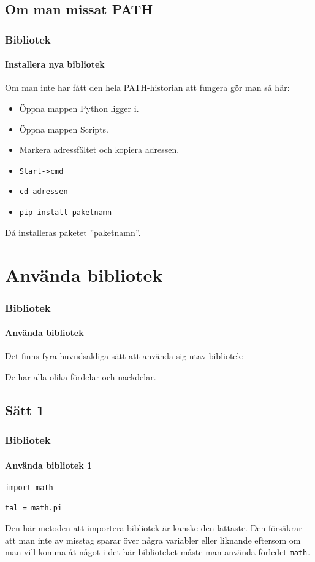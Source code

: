 \documentclass{beamer}
\begin{document}
\subsection{Om man missat PATH}

\begin{frame}[fragile]
	\frametitle{Bibliotek}
	\framesubtitle{Installera nya bibliotek}
	
	Om man inte har fått den hela PATH-historian att fungera gör man så här:
	
	\begin{itemize}
		\item Öppna mappen Python ligger i.
		\item Öppna mappen Scripts.
		\item Markera adressfältet och kopiera adressen.
		\item \texttt{Start->cmd}
		\item \texttt{cd adressen}
		\item \texttt{pip install paketnamn}
	\end{itemize}
	
	Då installeras paketet ''paketnamn''.

\end{frame}

\section{Använda bibliotek}

\begin{frame}
	\frametitle{Bibliotek}
	\framesubtitle{Använda bibliotek}
	
	Det finns fyra huvudsakliga sätt att använda sig utav bibliotek:
	
	De har alla olika fördelar och nackdelar.

\end{frame}

\subsection{Sätt 1}

\begin{frame}[fragile]
	\frametitle{Bibliotek}
	\framesubtitle{Använda bibliotek 1}
	
	\begin{lstlisting}
import math

tal = math.pi
	\end{lstlisting}
	
	Den här metoden att importera bibliotek är kanske den lättaste. Den försäkrar att man inte av misstag sparar över några variabler eller liknande eftersom om man vill komma åt något i det här biblioteket måste man använda förledet \texttt{math.}

\end{frame}
\end{document}
